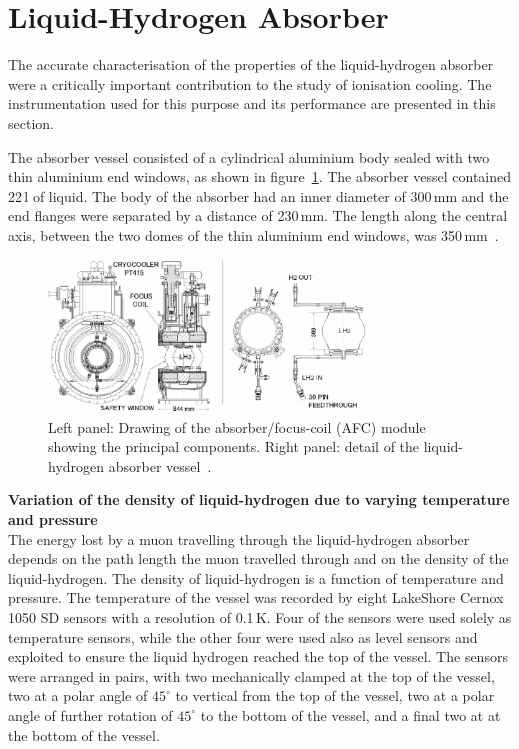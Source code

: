 \graphicspath{{07-Absorber/Figures/}}

\section{Liquid-Hydrogen Absorber}
\label{Sect:Absorber}

The accurate characterisation of the properties of the liquid-hydrogen
absorber were a critically important contribution to the study of
ionisation cooling.
The instrumentation used for this purpose and its performance are
presented in this section.

The absorber vessel consisted of a cylindrical aluminium body sealed
with two thin aluminium end windows, as shown in
figure~\ref{Fig:AbsorberVessel:Diag}.
The absorber vessel contained 22\,l of liquid.
The body of the absorber had an inner diameter of 300\,mm and the end
flanges were separated by a distance of 230\,mm.  
The length along the central axis, between the two domes of the thin
aluminium end windows, was 350\,mm~\cite{1748-0221-13-09-T09008}. \\
\begin{figure}
  \begin{center}
    \includegraphics[width=0.75\textwidth]{AFC-drwng.pdf}
  \end{center}
  \caption{
    Left panel: Drawing of the absorber/focus-coil (AFC) module
    showing the principal components.
    Right panel: detail of the liquid-hydrogen absorber vessel~\cite{1748-0221-13-09-T09008}.
  }
  \label{Fig:AbsorberVessel:Diag}
\end{figure}

\noindent\textbf{Variation of the density of liquid-hydrogen due to
    varying temperature and pressure} \\
\noindent
The energy lost by a muon travelling through the liquid-hydrogen
absorber depends on the path length the muon travelled through and on
the density of the liquid-hydrogen. The density of liquid-hydrogen is
a function of temperature and pressure.  
The temperature of the vessel was recorded by eight LakeShore Cernox
1050 SD sensors with a resolution of 0.1\,K. 
Four of the sensors were used solely as temperature sensors, while the
other four were used also as level sensors and exploited to ensure the
liquid hydrogen reached the top of the vessel. 
The sensors were arranged in pairs, with two mechanically clamped at
the top of the vessel, two at a polar angle of ${45}^{\circ}$ to
vertical from the top of the vessel, two at a polar angle of
further rotation of  ${45}^{\circ}$ to the bottom of the vessel, and a
final two at at the bottom of the vessel. 

